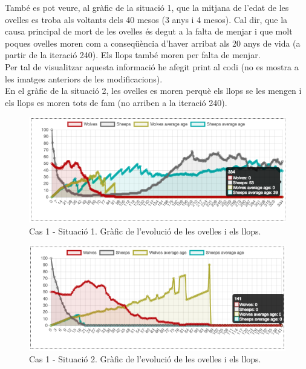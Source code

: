 \documentclass{article} %
\begin{document}
{	També es pot veure, al gràfic de la situació 1, que la mitjana de l'edat de les ovelles es troba als voltants dels 40 mesos (3 anys i 4 mesos). Cal dir, que la causa principal de mort de les ovelles és degut a la falta de menjar i que molt poques ovelles moren com a conseqüència d'haver arribat als 20 anys de vida (a partir de la iteració 240). Els llops també moren per falta de menjar. \\

	Per tal de visualitzar aquesta informació he afegit {\selectfont\small print} al codi (no es mostra a les imatges anteriors de les modificacions). \\

	En el gràfic de la situació 2, les ovelles es moren perquè els llops se les mengen i els llops es moren tots de fam (no arriben a la iteració 240). \\

	\begin{figure}[H]
		\begin{changemargin}{-1cm}{0.5cm}
			\includegraphics[width=14cm]{mod_case_1_graph_sheeps}
			\centering
			\color{blue}
			\caption{Cas 1 - Situació 1. Gràfic de l'evolució de les ovelles i els llops.}\label{visina8}
		\end{changemargin}
	\end{figure}

	\begin{figure}[H]
		\begin{changemargin}{-1cm}{0.5cm}
			\includegraphics[width=14cm]{mod_case_1_graph_grass}
			\centering
			\color{blue}
			\caption{Cas 1 - Situació 2. Gràfic de l'evolució de les ovelles i els llops.}\label{visina8}
		\end{changemargin}
	\end{figure}

}
\end{document}
